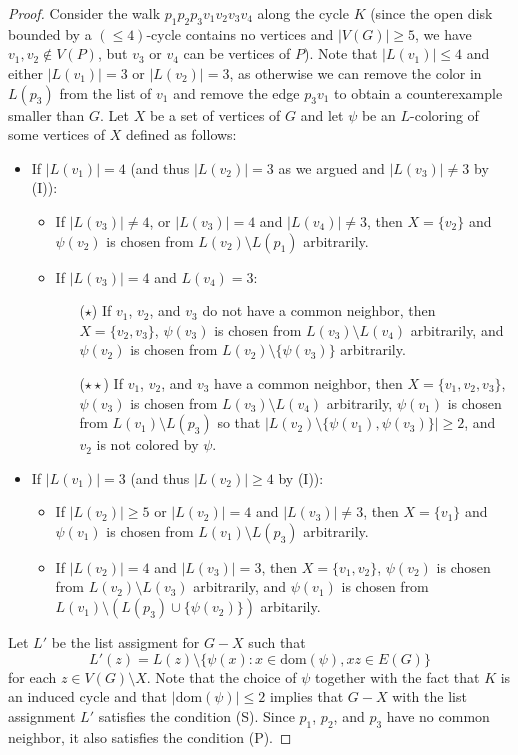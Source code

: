 \documentclass[12pt,twoside,openright,a4paper]{book}
\begin{document}
\begin{proof}
Consider the walk $p_1p_2p_3v_1v_2v_3v_4$ along the cycle $K$ (since the open disk bounded by a $(\le\!4)$-cycle contains no
vertices and $|V(G)|\ge 5$, we have $v_1,v_2\not\in V(P)$, but $v_3$ or $v_4$ can be vertices of $P$).
Note that $|L(v_1)|\le 4$ and either $|L(v_1)|=3$ or $|L(v_2)|=3$, as otherwise we can remove the color in $L(p_3)$ from the
list of $v_1$ and remove the edge $p_3v_1$ to obtain a counterexample smaller than $G$.
Let $X$ be a set of vertices of $G$ and let $\psi$ be an $L$-coloring of some vertices of $X$ defined as follows:
\begin{itemize}
\item If $|L(v_1)|=4$ (and thus $|L(v_2)|=3$ as we argued and $|L(v_3)|\neq 3$ by (I)):
\begin{itemize}
\item If $|L(v_3)|\neq 4$, or $|L(v_3)|=4$ and $|L(v_4)|\neq 3$, then $X=\{v_2\}$ and $\psi(v_2)$ is chosen
from $L(v_2)\setminus L(p_1)$ arbitrarily.
\item If $|L(v_3)|=4$ and $L(v_4)=3$:
\begin{itemize}
\item[($\star$)] If $v_1$, $v_2$, and $v_3$ do not have a common neighbor, then $X=\{v_2,v_3\}$, $\psi(v_3)$ is chosen from $L(v_3)\setminus L(v_4)$
arbitrarily, and $\psi(v_2)$ is chosen from $L(v_2)\setminus \{\psi(v_3)\}$ arbitrarily.
\item[($\star\star$)] If $v_1$, $v_2$, and $v_3$ have a common neighbor, then $X=\{v_1,v_2,v_3\}$, $\psi(v_3)$ is chosen from $L(v_3)\setminus L(v_4)$
arbitrarily, $\psi(v_1)$ is chosen from $L(v_1)\setminus L(p_3)$ so that $|L(v_2)\setminus \{\psi(v_1),\psi(v_3)\}|\ge 2$,
and $v_2$ is not colored by $\psi$.
\end{itemize}
\end{itemize}
\item If $|L(v_1)|=3$ (and thus $|L(v_2)|\ge 4$ by (I)):
\begin{itemize}
\item If $|L(v_2)|\ge 5$ or $|L(v_2)|=4$ and $|L(v_3)|\neq 3$, then $X=\{v_1\}$ and $\psi(v_1)$ is chosen from $L(v_1)\setminus L(p_3)$ arbitrarily.
\item If $|L(v_2)|=4$ and $|L(v_3)|=3$, then $X=\{v_1,v_2\}$, $\psi(v_2)$ is chosen from $L(v_2)\setminus L(v_3)$ arbitrarily,
and $\psi(v_1)$ is chosen from $L(v_1)\setminus (L(p_3)\cup \{\psi(v_2)\})$ arbitarily.
\end{itemize}
\end{itemize}
Let $L'$ be the list assigment for $G-X$ such that $$L'(z)=L(z)\setminus\{\psi(x):x\in\text{dom}(\psi), xz\in E(G)\}$$
for each $z\in V(G)\setminus X$.  Note that the choice of $\psi$ together with the fact that $K$ is an induced cycle and
that $|\text{dom}(\psi)|\le 2$ implies that $G-X$ with the list assignment $L'$ satisfies the condition (S).
Since $p_1$, $p_2$, and $p_3$ have no common neighbor, it also satisfies the condition (P).


\end{proof}
\end{document}
